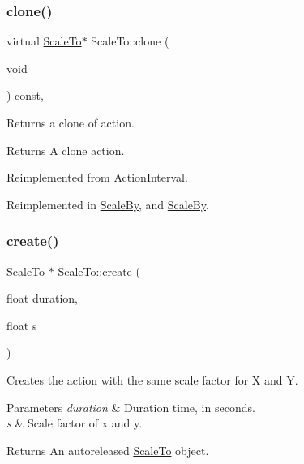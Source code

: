 \mbox{\label{classScaleTo_a5e7104838e1989eb1f301468ebd0ffe7}} 
\subsubsection{\texorpdfstring{clone()}{clone()}\hspace{0.1cm}{\footnotesize\ttfamily [2/2]}}
{\footnotesize\ttfamily virtual \hyperlink{classScaleTo}{Scale\+To}$\ast$ Scale\+To\+::clone (\begin{DoxyParamCaption}\item[{void}]{ }\end{DoxyParamCaption}) const\hspace{0.3cm}{\ttfamily [override]}, {\ttfamily [virtual]}}

Returns a clone of action.

\begin{DoxyReturn}{Returns}
A clone action. 
\end{DoxyReturn}


Reimplemented from \hyperlink{classActionInterval_abc93ce0c2f54a90eb216a7803f25f44a}{Action\+Interval}.



Reimplemented in \hyperlink{classScaleBy_abce00bc9338d8fc1fe3a765b62947d1d}{Scale\+By}, and \hyperlink{classScaleBy_a70d07c840c1ad6582695497afe970446}{Scale\+By}.

\mbox{\label{classScaleTo_a6052ccf3f347dfabeb13db58de42e648}} 
\subsubsection{\texorpdfstring{create()}{create()}\hspace{0.1cm}{\footnotesize\ttfamily [1/6]}}
{\footnotesize\ttfamily \hyperlink{classScaleTo}{Scale\+To} $\ast$ Scale\+To\+::create (\begin{DoxyParamCaption}\item[{float}]{duration,  }\item[{float}]{s }\end{DoxyParamCaption})\hspace{0.3cm}{\ttfamily [static]}}

Creates the action with the same scale factor for X and Y. 
\begin{DoxyParams}{Parameters}
{\em duration} & Duration time, in seconds. \\
\hline
{\em s} & Scale factor of x and y. \\
\hline
\end{DoxyParams}
\begin{DoxyReturn}{Returns}
An autoreleased \hyperlink{classScaleTo}{Scale\+To} object. 
\end{DoxyReturn}
\mbox{\label{classScaleTo_addffb00ade532bd18d16af5ae81d6b5e}} 
